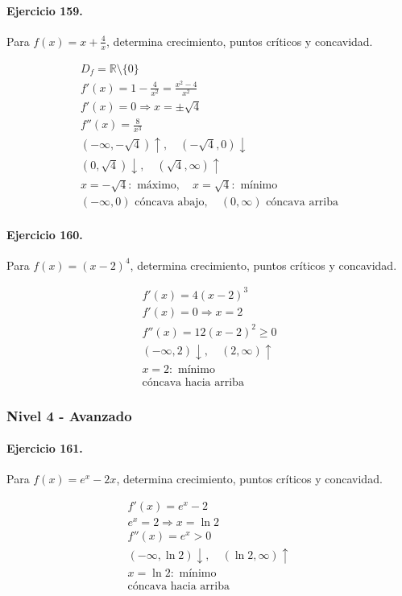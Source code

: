 \documentclass[11pt,a4paper]{article}
\begin{document}
\paragraph{Ejercicio 159.} Para $f(x)=x+\frac{4}{x}$, determina crecimiento, puntos críticos y concavidad.

\[
\begin{aligned}
D_f=\mathbb{R}\setminus\{0\}\\
f'(x)=1-\frac{4}{x^2}=\frac{x^2-4}{x^2}\\
f'(x)=0\Rightarrow x=\pm \sqrt{4}\\
f''(x)=\frac{8}{x^3}\\
(-\infty,-\sqrt{4})\uparrow,\quad(-\sqrt{4},0)\downarrow\\
(0,\sqrt{4})\downarrow,\quad(\sqrt{4},\infty)\uparrow\\
x=-\sqrt{4}:\text{ máximo},\quad x=\sqrt{4}:\text{ mínimo}\\
(-\infty,0)\text{{ cóncava abajo}},\quad(0,\infty)\text{{ cóncava arriba}}
\end{aligned}
\]


\paragraph{Ejercicio 160.} Para $f(x)=(x-2)^4$, determina crecimiento, puntos críticos y concavidad.

\[
\begin{aligned}
f'(x)=4(x-2)^3\\
f'(x)=0\Rightarrow x=2\\
f''(x)=12(x-2)^2\ge0\\
(-\infty,2)\downarrow,\quad(2,\infty)\uparrow\\
x=2:\text{ mínimo}\\
\text{{cóncava hacia arriba}}
\end{aligned}
\]


\newpage

\subsubsection*{Nivel 4 - Avanzado}

\paragraph{Ejercicio 161.} Para $f(x)=e^x-2x$, determina crecimiento, puntos críticos y concavidad.

\[
\begin{aligned}
f'(x)=e^x-2\\
e^x=2\Rightarrow x=\ln 2\\
f''(x)=e^x>0\\
(-\infty,\ln 2)\downarrow,\quad(\ln 2,\infty)\uparrow\\
x=\ln 2:\text{ mínimo}\\
\text{{cóncava hacia arriba}}
\end{aligned}
\]
\end{document}
